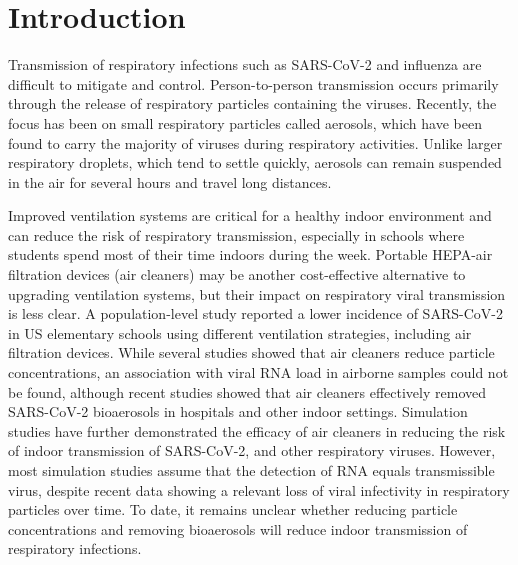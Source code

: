 \documentclass[fleqn,11pt]{wlscirep}
\begin{document}
 


\newpage

\setcounter{page}{1}

\section*{Introduction} 

Transmission of respiratory infections such as SARS-CoV-2 and influenza are difficult to mitigate and control. Person-to-person transmission occurs primarily through the release of respiratory particles containing the viruses. Recently, the focus has been on small respiratory particles called aerosols, which have been found to carry the majority of viruses during respiratory activities\cite{Fennelly2020}. Unlike larger respiratory droplets, which tend to settle quickly, aerosols can remain suspended in the air for several hours and travel long distances\cite{Wang2020}.

Improved ventilation systems are critical for a healthy indoor environment and can reduce the risk of respiratory transmission\cite{Wang2021,Morawska2021}, especially in schools where students spend most of their time indoors during the week. Portable HEPA-air filtration devices (air cleaners) may be another cost-effective alternative to upgrading ventilation systems, but their impact on respiratory viral transmission is less clear. A population-level study reported a lower incidence of SARS-CoV-2 in US elementary schools using different ventilation strategies, including air filtration devices\cite{Gettings2021}. While several studies showed that air cleaners reduce particle concentrations\cite{Park2020Build,Buising2022InfContr,Banholzer2023PLoSMed}, an association with viral RNA load in airborne samples could not be found\cite{Nor2021SciRep,Hanna2023PONE}, although recent studies showed that air cleaners effectively removed SARS-CoV-2 bioaerosols in hospitals and other indoor settings\cite{Morris2022,Ueki2022mSphere,Myers2022IndoorAir}. Simulation studies have further demonstrated the efficacy of air cleaners in reducing the risk of indoor transmission of SARS-CoV-2\cite{Lindsley2021}, and other respiratory viruses\cite{Cortellessa2023Build}. However, most simulation studies assume that the detection of RNA equals transmissible virus, despite recent data showing a relevant loss of viral infectivity in respiratory particles over time\cite{Oswin2022PNAS}. To date, it remains unclear whether reducing particle concentrations and removing bioaerosols will reduce indoor transmission of respiratory infections. 
\end{document}
